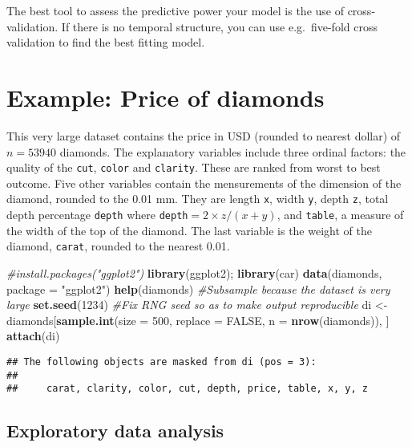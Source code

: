 \documentclass[]{book}
\newenvironment{Shaded}{\begin{snugshade}}{\end{snugshade}}
\newcommand{\CommentTok}[1]{\textcolor[rgb]{0.56,0.35,0.01}{\textit{#1}}}
\newcommand{\DataTypeTok}[1]{\textcolor[rgb]{0.13,0.29,0.53}{#1}}
\newcommand{\DecValTok}[1]{\textcolor[rgb]{0.00,0.00,0.81}{#1}}
\newcommand{\KeywordTok}[1]{\textcolor[rgb]{0.13,0.29,0.53}{\textbf{#1}}}
\newcommand{\NormalTok}[1]{#1}
\newcommand{\OtherTok}[1]{\textcolor[rgb]{0.56,0.35,0.01}{#1}}
\newcommand{\StringTok}[1]{\textcolor[rgb]{0.31,0.60,0.02}{#1}}
\theoremstyle{definition}
\theoremstyle{definition}
\theoremstyle{definition}
\theoremstyle{remark}
\begin{document}
The best tool to assess the predictive power your model is the use of
cross-validation. If there is no temporal structure, you can use
e.g.~five-fold cross validation to find the best fitting model.

\hypertarget{example-price-of-diamonds}{%
\section{Example: Price of diamonds}\label{example-price-of-diamonds}}

This very large dataset contains the price in USD (rounded to nearest
dollar) of \(n=53940\) diamonds. The explanatory variables include three
ordinal factors: the quality of the \texttt{cut}, \texttt{color} and
\texttt{clarity}. These are ranked from worst to best outcome. Five
other variables contain the mensurements of the dimension of the
diamond, rounded to the 0.01 mm. They are length \texttt{x}, width
\texttt{y}, depth \texttt{z}, total depth percentage \texttt{depth}
where \texttt{depth}\(=2\times z/(x + y)\), and \texttt{table}, a
measure of the width of the top of the diamond. The last variable is the
weight of the diamond, \texttt{carat}, rounded to the nearest 0.01.

\begin{Shaded}
\begin{Highlighting}[]
\CommentTok{#install.packages("ggplot2")}
\KeywordTok{library}\NormalTok{(ggplot2); }\KeywordTok{library}\NormalTok{(car)}
\KeywordTok{data}\NormalTok{(diamonds, }\DataTypeTok{package =} \StringTok{"ggplot2"}\NormalTok{)}
\KeywordTok{help}\NormalTok{(diamonds)}
\CommentTok{#Subsample because the dataset is very large}
\KeywordTok{set.seed}\NormalTok{(}\DecValTok{1234}\NormalTok{) }\CommentTok{#Fix RNG seed so as to make output reproducible}
\NormalTok{di <-}\StringTok{ }\NormalTok{diamonds[}\KeywordTok{sample.int}\NormalTok{(}\DataTypeTok{size =} \DecValTok{500}\NormalTok{, }\DataTypeTok{replace =} \OtherTok{FALSE}\NormalTok{, }\DataTypeTok{n =} \KeywordTok{nrow}\NormalTok{(diamonds)), ]}
\KeywordTok{attach}\NormalTok{(di)}
\end{Highlighting}
\end{Shaded}

\begin{verbatim}
## The following objects are masked from di (pos = 3):
## 
##     carat, clarity, color, cut, depth, price, table, x, y, z
\end{verbatim}

\hypertarget{exploratory-data-analysis}{%
\subsection{Exploratory data analysis}\label{exploratory-data-analysis}}
\end{document}
